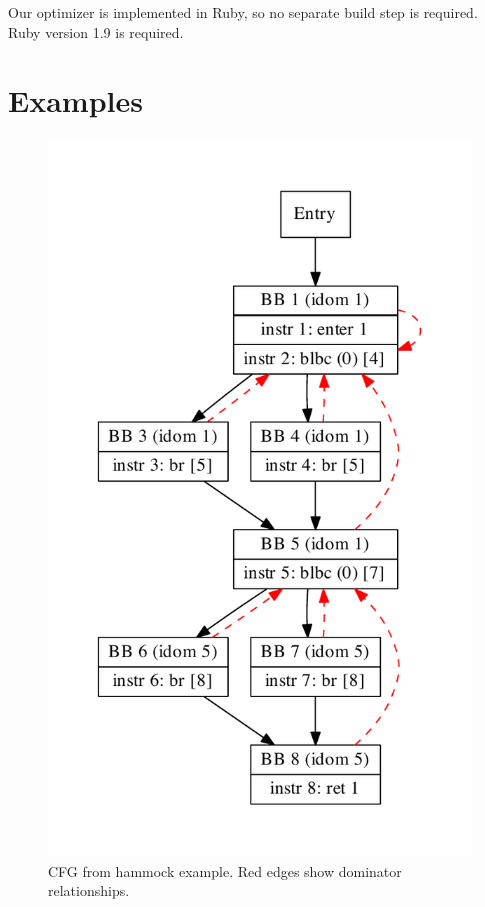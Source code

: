 \documentclass[10pt,twocolumn]{article}
\begin{document}
Our optimizer is implemented in Ruby, so no separate build step is
required. Ruby version 1.9 is required.

\section{Examples}

\begin{figure}
\begin{center}
  \includegraphics[width=0.95\columnwidth]{figs/hammock.pdf}
\begin{minipage}{0.95\columnwidth}
  \caption{\label{fig:hammock} CFG from hammock example. Red edges show dominator relationships.}
\end{minipage}
\end{center}
\end{figure}
\end{document}
